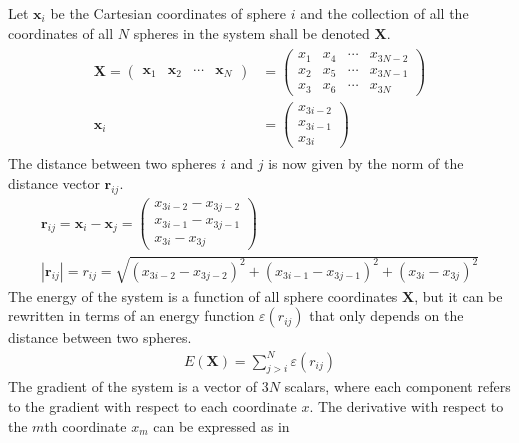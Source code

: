 Let $\mathbf{x}_i$ be the Cartesian coordinates of sphere $i$ and the
collection of all the coordinates of all $N$ spheres in the system shall be
denoted $\mathbf{X}$.
%
\begin{align}
    \begin{aligned}
        \mathbf{X}=
        \begin{pmatrix}
            \mathbf{x}_1 & \mathbf{x}_2 & \cdots & \mathbf{x}_N
        \end{pmatrix}&=
        \begin{pmatrix}
            x_1 & x_4 & \cdots & x_{3N-2}\\
            x_2 & x_5 & \cdots & x_{3N-1}\\
            x_3 & x_6 & \cdots & x_{3N}
        \end{pmatrix}\\
            \mathbf{x}_i &= 
            \begin{pmatrix}
                x_{3i-2}\\
                x_{3i-1}\\
                x_{3i}
            \end{pmatrix}
    \end{aligned}
\end{align}%
%
The distance between two spheres $i$ and $j$ is now given by the norm of the
distance vector $\mathbf{r}_{ij}$. %
%
\begin{align}
    \mathbf{r}_{ij}=\mathbf{x}_i-\mathbf{x}_j=
    \begin{pmatrix}
        x_{3i-2} - x_{3j-2}\\
        x_{3i-1} - x_{3j-1}\\
        x_{3i} - x_{3j}
    \end{pmatrix}\label{eq:distancevector}\\
    |\mathbf{r}_{ij}|=r_{ij}=\sqrt{(x_{3i-2} - x_{3j-2})^2 + (x_{3i-1} - x_{3j-1})^2 + (x_{3i} - x_{3j})^2}\label{eq:distance}
\end{align}
%
The energy of the system is a function of all sphere coordinates $\mathbf{X}$,
but it can be rewritten in terms of an energy function $\varepsilon(r_{ij})$ that only depends on the
distance between two spheres. %
%
\begin{align}
    E(\mathbf{X})=\sum_{j>i}^N\varepsilon(r_{ij})
\end{align}%
%
The gradient of the system is a vector of $3N$ scalars, where each component
refers to the gradient with respect to each coordinate $x$. The derivative with
respect to the $m$th coordinate $x_m$ can be expressed as in
